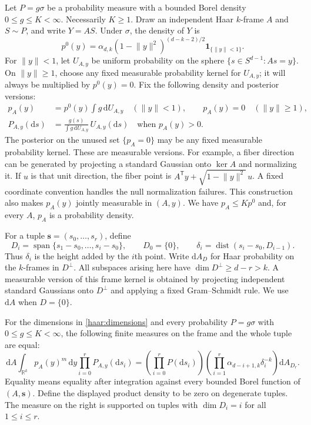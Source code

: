 Let $P=g\sigma$ be a probability measure with a bounded Borel density
$0\le g\le K<\infty$.  Necessarily $K\ge1$.  Draw an independent Haar
$k$-frame $A$ and $S\sim P$, and write $Y=AS$.  Under $\sigma$, the
density of $Y$ is
\[
 p^0(y)=\alpha_{d,k}(1-\lVert y\rVert^2)^{(d-k-2)/2}
        \mathbf 1_{\{\lVert y\rVert<1\}}.
\]
For $\lVert y\rVert<1$, let $U_{A,y}$ be uniform probability on the
sphere $\{s\in S^{d-1}:As=y\}$.  On $\lVert y\rVert\ge1$, choose any
fixed measurable probability kernel for $U_{A,y}$; it will always be
multiplied by $p^0(y)=0$.  Fix the following density and posterior
versions:
\begin{equation}\label{haar:posterior}
 \begin{split}
 p_A(y)&=p^0(y)\int g\,\mathrm dU_{A,y}
             \quad (\lVert y\rVert<1),\qquad
 p_A(y)=0\quad (\lVert y\rVert\ge1),\\
 P_{A,y}(\mathrm ds)&=
    \frac{g(s)}{\int g\,\mathrm dU_{A,y}}\,U_{A,y}(\mathrm ds)
       \quad\text{when }p_A(y)>0.
 \end{split}
\end{equation}
The posterior on the unused set $\{p_A=0\}$ may be any fixed measurable
probability kernel.  These are measurable versions.  For example, a
fiber direction can be generated by projecting a standard Gaussian onto
$\ker A$ and normalizing it.  If $u$ is that unit direction, the fiber
point is $A^{\mathsf T}y+\sqrt{1-\lVert y\rVert^2}\,u$.  A fixed
coordinate convention handles the null normalization failures.  This
construction
also makes $p_A(y)$ jointly measurable in $(A,y)$.  We have
$p_A\le Kp^0$ and, for every $A$, $p_A$ is a probability density.

For a tuple $\boldsymbol s=(s_0,\ldots,s_r)$, define
\[
 D_i=\operatorname{span}\{s_1-s_0,\ldots,s_i-s_0\},\qquad D_0=\{0\},
 \qquad
 \delta_i=\operatorname{dist}(s_i-s_0,D_{i-1}).
\]
Thus $\delta_i$ is the height added by the $i$th point.  Write
$\mathrm dA_D$ for Haar probability on the $k$-frames in $D^\perp$.
All subspaces arising here have $\dim D^\perp\ge d-r>k$.  A measurable
version of this frame kernel is obtained by projecting independent
standard Gaussians onto $D^\perp$ and applying a fixed Gram--Schmidt
rule.  We use $\mathrm dA$ when $D=\{0\}$.

\begin{lemma}\label{haar:coarea}
For the dimensions in \eqref{haar:dimensions} and every probability
$P=g\sigma$ with $0\le g\le K<\infty$, the following finite measures on
the frame and the whole tuple are equal:
\begin{equation}\label{haar:coarea-identity}
 \mathrm dA\int_{\mathbb R^k}p_A(y)^m\,\mathrm dy
       \prod_{i=0}^r P_{A,y}(\mathrm ds_i)
 =\left(\prod_{i=0}^rP(\mathrm ds_i)\right)
       \left(\prod_{i=1}^r\alpha_{d-i+1,k}\delta_i^{-k}\right)
       \mathrm dA_{D_r}.
\end{equation}
Equality means equality after integration against every bounded Borel
function of $(A,\boldsymbol s)$.  Define the displayed product density
to be zero on degenerate tuples.  The measure on the right is supported
on tuples with $\dim D_i=i$ for all $1\le i\le r$.
\end{lemma}

